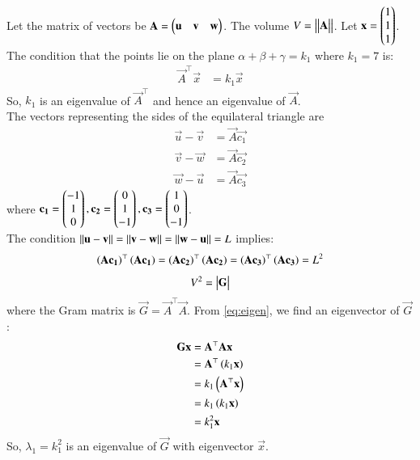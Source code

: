 \documentclass[xournal]{IEEEtran}
\begin{document}
Let the matrix of vectors be $\mathbf{A} = \begin{pmatrix}\mathbf{u} & \mathbf{v} & \mathbf{w}\end{pmatrix}$. The volume $V = \left\vert\begin{vmatrix}\mathbf{A}\end{vmatrix}\right\vert$.
Let $\mathbf{x} = \begin{pmatrix}1 \\ 1 \\ 1\end{pmatrix}$. The condition that the points lie on the plane $\alpha+\beta+\gamma=k_1$ where $k_1=7$ is:
\begin{align}
    \vec{A}^\top\vec{x} &= k_1\vec{x} \label{eq:eigen}
\end{align}
So, $k_1$ is an eigenvalue of $\vec{A}^\top$ and hence an eigenvalue of $\vec{A}$. \\
The vectors representing the sides of the equilateral triangle are
\begin{align}
    \vec{u} - \vec{v} &= \vec{A}\vec{c_1} \label{eq:1} \\
    \vec{v} - \vec{w} &= \vec{A}\vec{c_2} \label{eq:2} \\
    \vec{w} - \vec{u} &= \vec{A}\vec{c_3} \label{eq:3}
\end{align}
where $\mathbf{c_1} = \begin{pmatrix}-1 \\ 1 \\ 0\end{pmatrix}, \mathbf{c_2} = \begin{pmatrix}0 \\ 1 \\ -1\end{pmatrix}, \mathbf{c_3} = \begin{pmatrix}1 \\ 0 \\ -1\end{pmatrix}$. \\
The condition $\left\lVert\mathbf{u} - \mathbf{v}\right\rVert = \left\lVert\mathbf{v} - \mathbf{w}\right\rVert = \left\lVert\mathbf{w} - \mathbf{u}\right\rVert = L$ implies:
\begin{align}
    \left(\mathbf{A}\mathbf{c_1}\right)^\top\left(\mathbf{A}\mathbf{c_1}\right) = \left(\mathbf{A}\mathbf{c_2}\right)^\top\left(\mathbf{A}\mathbf{c_2}\right) = \left(\mathbf{A}\mathbf{c_3}\right)^\top\left(\mathbf{A}\mathbf{c_3}\right) = L^2 \label{eq:gram}
\end{align}
\begin{align}
    V^2 = \begin{vmatrix}\mathbf{G}\end{vmatrix} 
\end{align}
where the Gram matrix is $\vec{G} = \vec{A}^\top\vec{A}$. From \eqref{eq:eigen}, we find an eigenvector of $\vec{G}$:
\begin{align}
    \mathbf{G}\mathbf{x} &= \mathbf{A}^\top\mathbf{A}\mathbf{x} \\
    &= \mathbf{A}^\top\left(k_1\mathbf{x}\right) \\
    &= k_1\left(\mathbf{A}^\top\mathbf{x}\right) \\
    &= k_1\left(k_1\mathbf{x}\right) \\
    &= k_1^2\mathbf{x}
\end{align}
So, $\lambda_1 = k_1^2$ is an eigenvalue of $\vec{G}$ with eigenvector $\vec{x}$. \\
\end{document}
